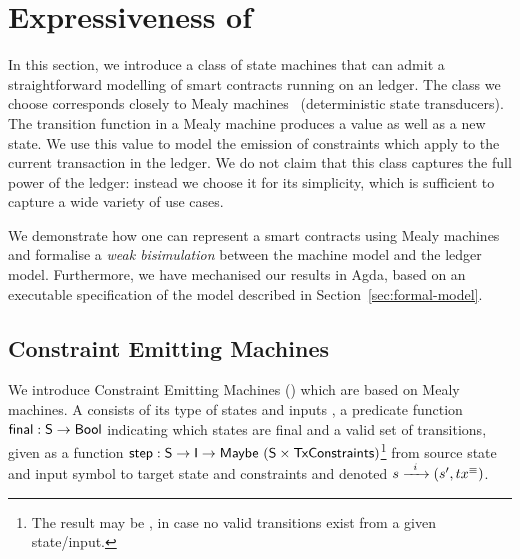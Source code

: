 \section{Expressiveness of \EUTXO{}}
\label{sec:expressiveness}

In this section, we introduce a class of state machines that can admit
a straightforward modelling of smart contracts running on an \EUTXO{}
ledger. The class we choose corresponds closely to Mealy
machines~\cite{mealy} (deterministic state transducers). The transition
function in a Mealy machine produces a value as well as a new
state. We use this value to model the emission of constraints which
apply to the current transaction in the ledger. We do not claim that
this class captures the full power of the ledger: instead we choose it
for its simplicity, which is sufficient to capture a wide variety of
use cases.

We demonstrate how one can represent a smart contracts using Mealy
machines and formalise a \textit{weak bisimulation} between the
machine model and the ledger model.  Furthermore, we have mechanised
our results in Agda, based on an executable
specification of the model described in
Section~\ref{sec:formal-model}.

\subsection{Constraint Emitting Machines}
We introduce Constraint Emitting Machines (\CEM{}) which are based on
Mealy machines. A \CEM{} consists of its type of states  and inputs
, a predicate function $\textsf{final} : \textsf{S} \rightarrow \textsf{Bool}$
indicating which states are final and a valid set of transitions,
given as a function $\textsf{step} : \textsf{S} \rightarrow \textsf{I} \rightarrow
\textsf{Maybe}\ (\textsf{S} \times \textsf{TxConstraints})$\footnote{
The result may be , in case no valid transitions exist from a given state/input.
}
from source state and input symbol to target state and constraints and
denoted $ s \xrightarrow{\hspace{5pt} i \hspace{5pt}} (s' , tx^\equiv) $.

